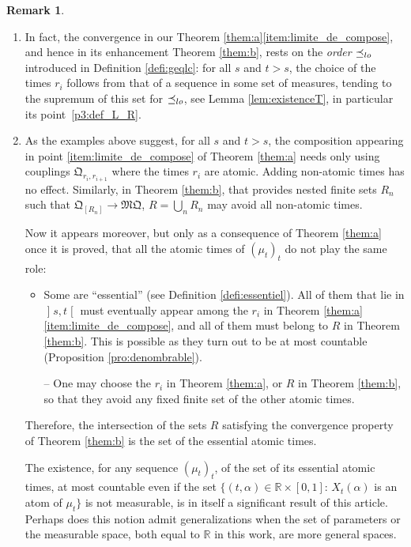 \documentclass[11pt]{article}
\newcommand{\skpt}{\smallskip}
\theoremstyle{plain}
\theoremstyle{definition}
\newtheorem{rem}[them]{Remark}
\newcommand{\como}{\mathfrak{Q}}
\newcommand{\mq}{\mathfrak{MQ}}
\newcommand{\R}{\mathbb{R}}
\newcommand{\op}{\mathopen}
\newcommand{\clo}{\mathclose}
\newcommand{\leqlc}{\preceq_{\rm lo}}
\begin{document}
\skpt
\begin{rem}\label{rem:choix}
\begin{enumerate}
\item
In fact, the convergence in our Theorem \ref{them:a}\eqref{item:limite_de_compose}, and hence in its enhancement Theorem \ref{them:b}, rests on the \emph{order} $\leqlc$ introduced in Definition \ref{defi:geqlc}: for all $s$ and $t>s$, the choice of the times $r_i$ follows from that of a sequence in some set of measures, tending to the supremum of this set for $\leqlc$, see Lemma \ref{lem:existenceT}, in particular its point~\eqref{p3:def_L_R}.

\item
As the examples above suggest, for all $s$ and $t>s$, the composition appearing in point \eqref{item:limite_de_compose} of Theorem \ref{them:a} needs only using couplings $\como_{r_i,r_{i+1}}$ where the times $r_i$ are atomic. Adding non-atomic times has no effect. Similarly, in Theorem \ref{them:b}, that provides nested finite sets $R_n$ such that $\como_{[R_n]}\to\mq$, $R=\bigcup_nR_n$ may avoid all non-atomic times.

Now it appears moreover, but only as a consequence of Theorem \ref{them:a} once it is proved, that all the atomic times of $(\mu_t)_t$ do not play the same role:
\begin{itemize}
\item
Some are ``essential'' (see Definition \ref{defi:essentiel}). All of them that lie in $\op]s,t\clo[$ must eventually appear among the $r_i$ in Theorem \ref{them:a}\eqref{item:limite_de_compose}, and all of them must belong to $R$ in Theorem \ref{them:b}. This is possible as they turn out to be at most countable (Proposition \ref{pro:denombrable}).

-- One may choose the $r_i$ in Theorem \ref{them:a}, or $R$ in Theorem \ref{them:b}, so that they avoid any fixed finite set of the other atomic times.
\end{itemize}
Therefore, the intersection of the sets $R$ satisfying the convergence property of Theorem \ref{them:b} is the set of the essential atomic times.

The existence, for any sequence $(\mu_t)_t$, of the set of its essential atomic times, at most countable even if the set $\{(t,\alpha)\in\R\times[0,1]:\,X_t(\alpha)$ is an atom of $\mu_t\}$ is not measurable, is in itself a significant result of this article. Perhaps does this notion admit generalizations when the set of parameters or the measurable space, both equal to $\R$ in this work, are more general spaces.
\end{enumerate}
\end{rem}
\end{document}
